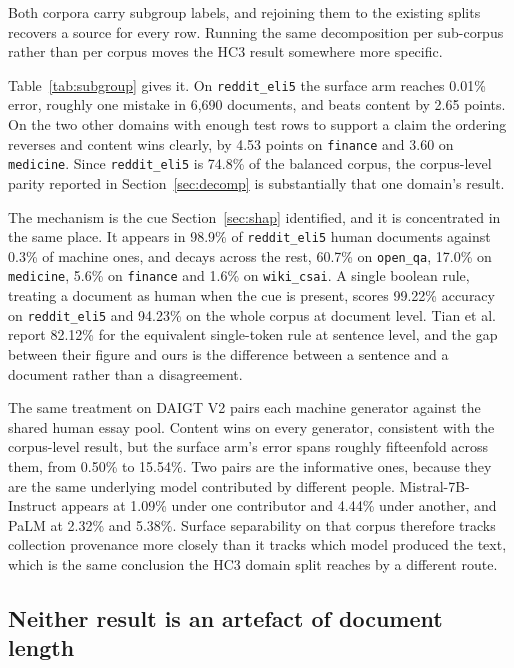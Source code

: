 Both corpora carry subgroup labels, and rejoining them to the existing splits recovers a source for every row. Running the same decomposition per sub-corpus rather than per corpus moves the HC3 result somewhere more specific.

Table~\ref{tab:subgroup} gives it. On \texttt{reddit\_eli5} the surface arm reaches 0.01\% error, roughly one mistake in 6,690 documents, and beats content by 2.65 points. On the two other domains with enough test rows to support a claim the ordering reverses and content wins clearly, by 4.53 points on \texttt{finance} and 3.60 on \texttt{medicine}. Since \texttt{reddit\_eli5} is 74.8\% of the balanced corpus, the corpus-level parity reported in Section~\ref{sec:decomp} is substantially that one domain's result.

The mechanism is the cue Section~\ref{sec:shap} identified, and it is concentrated in the same place. It appears in 98.9\% of \texttt{reddit\_eli5} human documents against 0.3\% of machine ones, and decays across the rest, 60.7\% on \texttt{open\_qa}, 17.0\% on \texttt{medicine}, 5.6\% on \texttt{finance} and 1.6\% on \texttt{wiki\_csai}. A single boolean rule, treating a document as human when the cue is present, scores 99.22\% accuracy on \texttt{reddit\_eli5} and 94.23\% on the whole corpus at document level. Tian et al.~\cite{Tian2023multiscale} report 82.12\% for the equivalent single-token rule at sentence level, and the gap between their figure and ours is the difference between a sentence and a document rather than a disagreement.

The same treatment on DAIGT V2 pairs each machine generator against the shared human essay pool. Content wins on every generator, consistent with the corpus-level result, but the surface arm's error spans roughly fifteenfold across them, from 0.50\% to 15.54\%. Two pairs are the informative ones, because they are the same underlying model contributed by different people. Mistral-7B-Instruct appears at 1.09\% under one contributor and 4.44\% under another, and PaLM at 2.32\% and 5.38\%. Surface separability on that corpus therefore tracks collection provenance more closely than it tracks which model produced the text, which is the same conclusion the HC3 domain split reaches by a different route.

\subsection{Neither result is an artefact of document length}
\label{sec:length}

